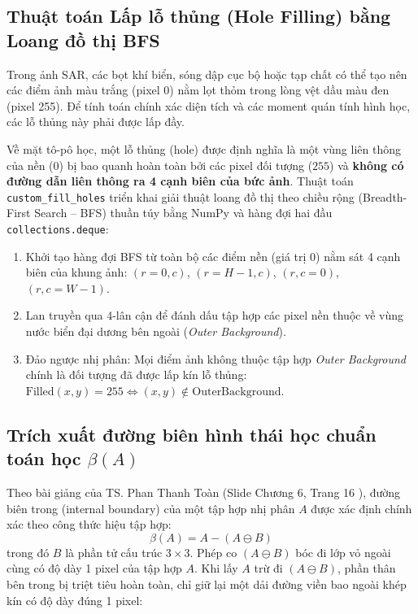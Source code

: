 \subsection{Thuật toán Lấp lỗ thủng (Hole Filling) bằng Loang đồ thị BFS}
\label{subsec:hole_filling}
Trong ảnh SAR, các bọt khí biển, sóng dập cục bộ hoặc tạp chất có thể tạo nên các điểm ảnh màu trắng (pixel 0) nằm lọt thỏm trong lòng vệt dầu màu đen (pixel 255). Để tính toán chính xác diện tích và các moment quán tính hình học, các lỗ thủng này phải được lấp đầy.

Về mặt tô-pô học, một lỗ thủng (hole) được định nghĩa là một vùng liên thông của nền ($0$) bị bao quanh hoàn toàn bởi các pixel đối tượng ($255$) và \textbf{không có đường dẫn liên thông ra 4 cạnh biên của bức ảnh}. Thuật toán \texttt{custom\_fill\_holes} triển khai giải thuật loang đồ thị theo chiều rộng (Breadth-First Search -- BFS) thuần túy bằng NumPy và hàng đợi hai đầu \texttt{collections.deque}:
\begin{enumerate}
    \item Khởi tạo hàng đợi BFS từ toàn bộ các điểm nền (giá trị $0$) nằm sát 4 cạnh biên của khung ảnh: $(r=0, c)$, $(r=H-1, c)$, $(r, c=0)$, $(r, c=W-1)$.
    \item Lan truyền qua 4-lân cận để đánh dấu tập hợp các pixel nền thuộc về vùng nước biển đại dương bên ngoài (\textit{Outer Background}).
    \item Đảo ngược nhị phân: Mọi điểm ảnh không thuộc tập hợp \textit{Outer Background} chính là đối tượng đã được lấp kín lỗ thủng: $\text{Filled}(x, y) = 255 \iff (x, y) \notin \text{OuterBackground}$.
\end{enumerate}

\subsection{Trích xuất đường biên hình thái học chuẩn toán học $\beta(A)$}
\label{subsec:boundary_extraction}
Theo bài giảng của TS. Phan Thanh Toàn (Slide Chương 6, Trang 16 \cite{toan2024xla}), đường biên trong (internal boundary) của một tập hợp nhị phân $A$ được xác định chính xác theo công thức hiệu tập hợp:
\begin{equation}
    \beta(A) = A - (A \ominus B)
    \label{eq:morph_boundary}
\end{equation}
trong đó $B$ là phần tử cấu trúc $3 \times 3$. Phép co $(A \ominus B)$ bóc đi lớp vỏ ngoài cùng có độ dày 1 pixel của tập hợp $A$. Khi lấy $A$ trừ đi $(A \ominus B)$, phần thân bên trong bị triệt tiêu hoàn toàn, chỉ giữ lại một dải đường viền bao ngoài khép kín có độ dày đúng 1 pixel:

